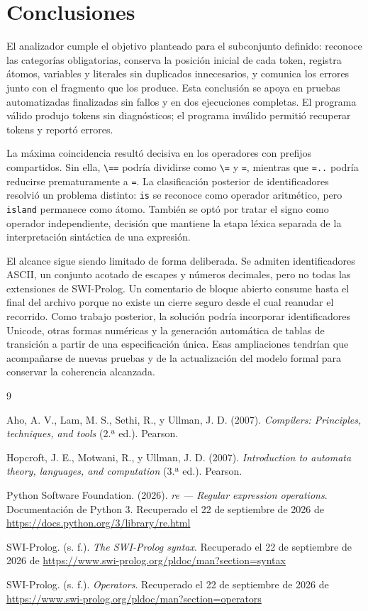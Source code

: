 \section{Conclusiones}

El analizador cumple el objetivo planteado para el subconjunto definido: reconoce las categorías obligatorias, conserva la posición inicial de cada token, registra átomos, variables y literales sin duplicados innecesarios, y comunica los errores junto con el fragmento que los produce. Esta conclusión se apoya en \PruebasTotal{} pruebas automatizadas finalizadas sin fallos y en dos ejecuciones completas. El programa válido produjo \TokensValidos{} tokens sin diagnósticos; el programa inválido permitió recuperar \TokensInvalidos{} tokens y reportó \ErroresInvalidos{} errores.

La máxima coincidencia resultó decisiva en los operadores con prefijos compartidos. Sin ella, \verb|\==| podría dividirse como \verb|\=| y \texttt{=}, mientras que \texttt{=..} podría reducirse prematuramente a \texttt{=}. La clasificación posterior de identificadores resolvió un problema distinto: \texttt{is} se reconoce como operador aritmético, pero \texttt{island} permanece como átomo. También se optó por tratar el signo como operador independiente, decisión que mantiene la etapa léxica separada de la interpretación sintáctica de una expresión.

El alcance sigue siendo limitado de forma deliberada. Se admiten identificadores ASCII, un conjunto acotado de escapes y números decimales, pero no todas las extensiones de SWI-Prolog. Un comentario de bloque abierto consume hasta el final del archivo porque no existe un cierre seguro desde el cual reanudar el recorrido. Como trabajo posterior, la solución podría incorporar identificadores Unicode, otras formas numéricas y la generación automática de tablas de transición a partir de una especificación única. Esas ampliaciones tendrían que acompañarse de nuevas pruebas y de la actualización del modelo formal para conservar la coherencia alcanzada.

\begin{thebibliography}{9}

Aho, A. V., Lam, M. S., Sethi, R., y Ullman, J. D. (2007). \textit{Compilers: Principles, techniques, and tools} (2.ª ed.). Pearson.

Hopcroft, J. E., Motwani, R., y Ullman, J. D. (2007). \textit{Introduction to automata theory, languages, and computation} (3.ª ed.). Pearson.

Python Software Foundation. (2026). \textit{re --- Regular expression operations}. Documentación de Python 3. Recuperado el 22 de septiembre de 2026 de \url{https://docs.python.org/3/library/re.html}

SWI-Prolog. (s. f.). \textit{The SWI-Prolog syntax}. Recuperado el 22 de septiembre de 2026 de \url{https://www.swi-prolog.org/pldoc/man?section=syntax}

SWI-Prolog. (s. f.). \textit{Operators}. Recuperado el 22 de septiembre de 2026 de \url{https://www.swi-prolog.org/pldoc/man?section=operators}

\end{thebibliography}
